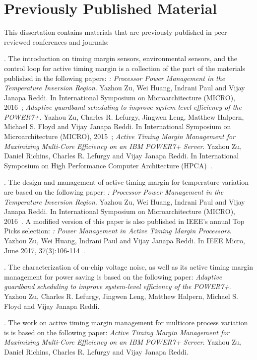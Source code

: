 \section{Previously Published Material}
\label{sec:intro:prev}

This dissertation contains materials that are previously published in peer-reviewed conferences and journals:

\textbf{}. The introduction on timing margin sensors, environmental sensors, and the control loop for active timing margin is a collection of the part of the materials published in the following papers: \textit{\tistates: Processor Power Management in the Temperature Inversion Region}. Yazhou Zu, Wei Huang, Indrani Paul and Vijay Janapa Reddi. In International Symposium on Microarchitecture (MICRO), 2016~\cite{zu2016tistate}; \textit{Adaptive guardband scheduling to improve system-level efficiency of the POWER7+}. Yazhou Zu, Charles R. Lefurgy, Jingwen Leng, Matthew Halpern, Michael S. Floyd and Vijay Janapa Reddi. In International Symposium on Microarchitecture (MICRO), 2015~\cite{zu2015adaptive}; \textit{Active Timing Margin Management for Maximizing Multi-Core Efficiency on an IBM POWER7+ Server}. Yazhou Zu, Daniel Richins, Charles R. Lefurgy and Vijay Janapa Reddi. In International Symposium on High Performance Computer Architecture (HPCA)~\cite{zu2019atm}.

\textbf{}. The design and management of active timing margin for temperature variation are based on the following paper: \textit{\tistates: Processor Power Management in the Temperature Inversion Region}. Yazhou Zu, Wei Huang, Indrani Paul and Vijay Janapa Reddi. In International Symposium on Microarchitecture (MICRO), 2016~\cite{zu2016tistate}. A modified version of this paper is also published in IEEE's annual Top Picks selection: \textit{\tistates: Power Management in Active Timing Margin Processors}. Yazhou Zu, Wei Huang, Indrani Paul and Vijay Janapa Reddi. In IEEE Micro, June 2017, 37(3):106-114~\cite{zu2017ti}.

\textbf{}. The characterization of on-chip voltage noise, as well as its active timing margin management for power saving is based on the following paper: \textit{Adaptive guardband scheduling to improve system-level efficiency of the POWER7+}. Yazhou Zu, Charles R. Lefurgy, Jingwen Leng, Matthew Halpern, Michael S. Floyd and Vijay Janapa Reddi. 

\textbf{}. The work on active timing margin management for multicore process variation is is based on the following paper: \textit{Active Timing Margin Management for Maximizing Multi-Core Efficiency on an IBM POWER7+ Server}. Yazhou Zu, Daniel Richins, Charles R. Lefurgy and Vijay Janapa Reddi.

